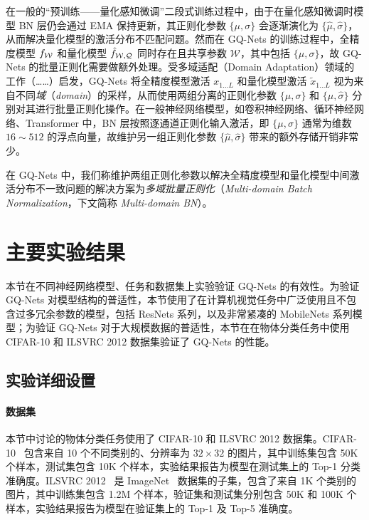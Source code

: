 在一般的“预训练——量化感知微调”二段式训练过程中，由于在量化感知微调时模型 BN 层仍会通过 EMA 保持更新，其正则化参数 $\{\mu, \sigma\}$ 会逐渐演化为 $\{\hat{\mu}, \hat{\sigma}\}$，从而解决量化模型的激活分布不匹配问题。然而在 GQ-Nets 的训练过程中，全精度模型 $f_{\mathcal{W}}$ 和量化模型 $\hat{f}_{\mathcal{W, Q}}$ 同时存在且共享参数 $\mathcal{W}$，其中包括 $\{\mu, \sigma\}$，故 GQ-Nets 的批量正则化需要做额外处理。受多域适配（Domain Adaptation）领域的工作（……）启发，GQ-Nets 将全精度模型激活 $x_{1\ldots L}$ 和量化模型激活 $\tilde{x}_{1\ldots L}$ 视为来自不同\emph{域}（\emph{domain}）的采样，从而使用两组分离的正则化参数 $\{\mu, \sigma\}$ 和 $\{\hat{\mu}, \hat{\sigma}\}$ 分别对其进行批量正则化操作。在一般神经网络模型，如卷积神经网络、循环神经网络、Transformer 中，BN 层按照逐通道正则化输入激活，即 $\{\mu, \sigma\}$ 通常为维数 $16\sim 512$ 的浮点向量，故维护另一组正则化参数 $\{\hat{\mu}, \hat{\sigma}\}$ 带来的额外存储开销非常少。

在 GQ-Nets 中，我们称维护两组正则化参数以解决全精度模型和量化模型中间激活分布不一致问题的解决方案为\emph{多域批量正则化}（\emph{Multi-domain Batch Normalization}，下文简称 \emph{Multi-domain BN}）。
\section{主要实验结果} \label{sec::gq_nets::exp}
本节在不同神经网络模型、任务和数据集上实验验证 GQ-Nets 的有效性。为验证 GQ-Nets 对模型结构的普适性，本节使用了在计算机视觉任务中广泛使用且不包含过多冗余参数的模型，包括 ResNets 系列，以及非常紧凑的 MobileNets 系列模型；为验证 GQ-Nets 对于大规模数据的普适性，本节在在物体分类任务中使用 CIFAR-10 和 ILSVRC 2012 数据集验证了 GQ-Nets 的性能。
\subsection{实验详细设置} \label{sec::gq_nets::general_conf}
\paragraph{数据集}
本节中讨论的物体分类任务使用了 CIFAR-10 和 ILSVRC 2012 数据集。CIFAR-10~\citep{krizhevsky2009learning} 包含来自 10 个不同类别的、分辨率为 $32 \times 32$ 的图片，其中训练集包含 50K 个样本，测试集包含 10K 个样本，实验结果报告为模型在测试集上的 Top-1 分类准确度。ILSVRC 2012~\citep{ILSVRC15} 是 ImageNet~\citep{deng2009imagenet} 数据集的子集，包含了来自 1K 个类别的图片，其中训练集包含 1.2M 个样本，验证集和测试集分别包含 50K 和 100K 个样本，实验结果报告为模型在验证集上的 Top-1 及 Top-5 准确度。

